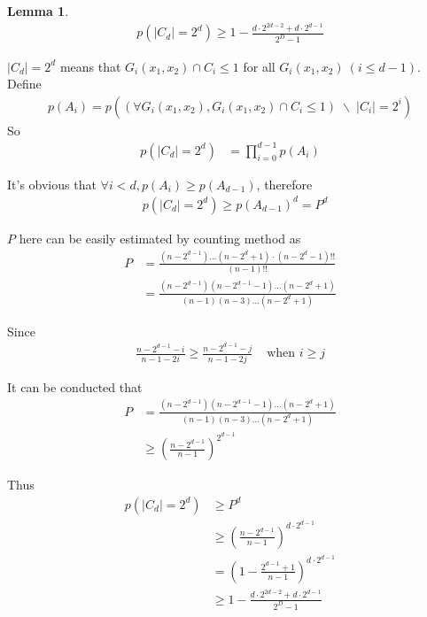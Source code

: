 \documentclass[10pt, conference, compsocconf]{IEEEtran}
\newtheorem{mylemma}{Lemma}
\begin{document}
		\begin{mylemma}
			\begin{align*}
				p(|C_d| = 2^d) \geq 1-\frac{d \cdot 2^{2d-2}+d \cdot 2^{d-1}}{2^D-1}
			\end{align*}
		\end{mylemma}
		
		\begin{IEEEproof}
			$|C_d| = 2^d$ means that $G_i(x_1, x_2) \cap C_i \leq 1$
			for all $G_i(x_1, x_2)~(i \leq d-1)$. Define
			\begin{align*}
				p(A_i) = p\left((\forall G_i(x_1, x_2), G_i(x_1, x_2) \cap C_i \leq 1)
					 \; \backslash \; |C_i| = 2^i\right)
			\end{align*}
			So
			\begin{align*}
				p(|C_d| = 2^d) &= \prod_{i=0}^{d-1} p(A_i)
			\end{align*}
			
			It's obvious that $\forall i < d, p(A_i) \geq p(A_{d-1})$, therefore
			\begin{align*}
				&p(|C_d| = 2^d) 
				\geq p(A_{d-1})^d
				= P^d
			\end{align*}
			
			$P$ here can be easily estimated by counting method as
			\begin{align*}
				P &= \frac{(n-2^{d-1})\ldots(n-2^d+1)\cdot (n-2^d-1)!!}{(n-1)!!}\\
					&= \frac{(n-2^{d-1})(n-2^{d-1}-1)\ldots (n-2^d+1)}{(n-1)(n-3)\ldots(n-2^d+1)}
			\end{align*}
			
			Since
			\begin{align*}
				\frac{n-2^{d-1}-i}{n-1-2i} \geq \frac{n-2^{d-1}-j}{n-1-2j} & \text{ when } i \geq j
			\end{align*}
			
			It can be conducted that
			\begin{align*}
				P &= \frac{(n-2^{d-1})(n-2^{d-1}-1)\ldots (n-2^d+1)}{(n-1)(n-3)\ldots(n-2^d+1)}\\
					&\geq (\frac{n-2^{d-1}}{n-1})^{2^{d-1}}
			\end{align*}
			
			Thus
			\begin{align*}
			p(|C_d| = 2^d) &\geq P^d\\
				&\geq (\frac{n-2^{d-1}}{n-1})^{d \cdot 2^{d-1}}\\
				&= (1-\frac{2^{d-1}+1}{n-1})^{d \cdot 2^{d-1}}\\
				&\geq 1-\frac{d \cdot 2^{2d-2}+d \cdot 2^{d-1}}{2^D-1}
			\end{align*}
		\end{IEEEproof}
		
\end{document}
